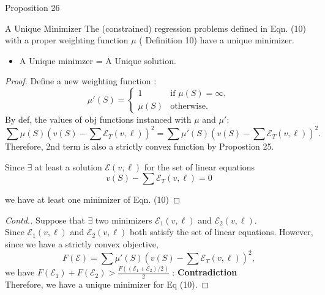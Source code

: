\documentclass[10pt]{beamer}
\newcommand{\f}{v}
\newcommand{\ex}{\Expl}
\def\Expl{\mathcal{E}}
\begin{document}
\begin{frame}{Proposition 26}
    \begin{myaxiombox}{A Unique Minimizer}
        The (constrained) regression problems defined in  Eqn. (10) with a proper weighting function $\mu$ ( Definition 10)
        have a unique minimizer.
    \end{myaxiombox}
    \vspace{1.5em}
    \begin{itemize}[label=\scalebox{0.5}{$\blacksquare$}]
        \item A Unique minimzer = A Unique solution.
    \end{itemize}
\end{frame}
\begin{frame}
    \begin{proof}
    
    Define a new weighting function :
    \[
    \mu'(S) = 
    \begin{cases} 
    1 & \text{if } \mu(S) = \infty, \\
    \mu(S) & \text{otherwise.}
    \end{cases}
    \]
    By def, the values of obj functions instanced with $\mu$ and $\mu'$:
    $$
    \sum  \mu(S) \left( \f(S) - \sum \Expl_T(\f,\ell) \right)^2
    = \sum  \mu'(S) \left( \f(S) - \sum\Expl_T(\f,\ell) \right)^2.
    $$
    Therefore, 2nd term is also a strictly convex function by Propostion 25.
    
    Since $\exists$ at least a solution $\ex(\f,\ell)$ for the set of linear equations \\
    $$\f(S) - \sum\Expl_T(\f,\ell) =0$$
    
    we have at least one minimizer of Eqn. (10)
    \renewcommand{\qedsymbol}{} %
    \end{proof}

    
\end{frame}
\begin{frame}
    \begin{proof}[Contd.]
        \vspace{0.3cm}
        Suppose that $\exists$ two minimizers $\ex_1(\f,\ell)$ and $\ex_2(\f,\ell)$. \\
        Since $\ex_1(\f,\ell)$ and $\ex_2(\f,\ell)$ both satisfy the set of linear equations. However, since we have a strictly convex objective,
        $$
        F(\ex) = \sum  \mu'(S) \left( \f(S) - \sum\Expl_T(\f,\ell) \right)^2,
        $$
        we have $F(\ex_1) + F(\ex_2) > \frac{F((\ex_1+\ex_2)/2)}{2}$ : \textbf{Contradiction} \\
        Therefore, we have a unique minimizer for Eq (10).
    \end{proof}
\end{frame}
\end{document}
